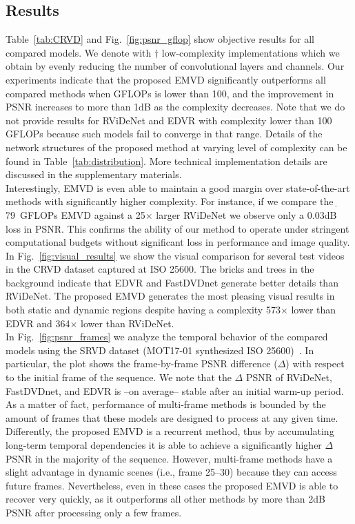 \documentclass[final]{cvpr}
\newcommand{\textapprox}{$_{\widetilde{~}}$}
\begin{document}
    \subsection{Results} 
    
    Table~\ref{tab:CRVD} and Fig.~\ref{fig:psnr_gflop} show objective results for all compared models. We denote with $\dagger$ low-complexity implementations which we obtain by evenly reducing the number of convolutional layers and channels. Our experiments indicate that the proposed EMVD significantly outperforms all compared methods when GFLOPs is lower than 100, and the improvement in PSNR increases to more than 1dB as the complexity decreases. Note that we do not provide results for RViDeNet and EDVR with complexity lower than 100 GFLOPs because such models fail to converge in that range. Details of the network structures of the proposed method at varying level of complexity can be found in Table~\ref{tab:distribution}. More technical implementation details are discussed in the supplementary materials. \\
    \indent Interestingly, EMVD is even able to maintain a good margin over state-of-the-art methods with significantly higher complexity. For instance, if we compare the \textapprox79~GFLOPs EMVD against a 25$\times$ larger RViDeNet we observe only a 0.03dB loss in PSNR. This confirms the ability of our method to operate under stringent computational budgets without significant loss in performance and image quality. In Fig.~\ref{fig:visual_results} we show the visual comparison for several test videos in the CRVD dataset captured at ISO 25600. The bricks and trees in the background indicate that EDVR and FastDVDnet generate better details than RViDeNet. The proposed EMVD generates the most pleasing visual results in both static and dynamic regions despite having a complexity 573$\times$ lower than EDVR and 364$\times$ lower than RViDeNet.\\
    \indent In Fig.~\ref{fig:psnr_frames} we analyze the temporal behavior of the compared models using the SRVD dataset (MOT17-01 synthesized ISO 25600)~\cite{chen2018sid,yue2020supervised}. In particular, the plot shows the frame-by-frame PSNR difference ($\Delta$) with respect to the initial frame of the sequence. We note that the $\Delta$ PSNR of RViDeNet, FastDVDnet, and EDVR is --on average-- stable after an initial warm-up period. As a matter of fact, performance of multi-frame methods is bounded by the amount of frames that these models are designed to process at any given time. Differently, the proposed EMVD is a recurrent method, thus by accumulating long-term temporal dependencies it is able to achieve a significantly higher $\Delta$ PSNR in the majority of the sequence. However, multi-frame methods have a slight advantage in dynamic scenes (i.e., frame 25--30) because they can access future frames. Nevertheless, even in these cases the proposed EMVD is able to recover very quickly, as it outperforms all other methods by more than 2dB PSNR after processing only a few frames.\\
\end{document}
